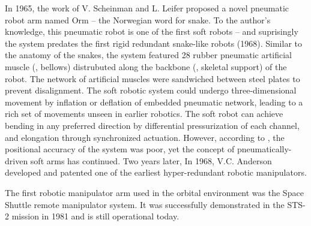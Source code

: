 In 1965, the work of V. Scheinman and L. Leifer proposed a novel pneumatic robot arm named Orm -- the Norwegian word for snake. To the author's knowledge, this pneumatic robot is one of the first soft robots -- and suprisingly the system predates the first rigid redundant snake-like robots (1968). Similar to the anatomy of the snakes, the system featured 28 rubber pneumatic artificial muscle (\ie, bellows) distrubuted along the backbone (\ie, skeletal support) of the robot. The network of artificial muscles were sandwiched between steel plates to prevent disalignment. The soft robotic system could undergo three-dimensional movement by inflation or deflation of embedded pneumatic network, leading to a rich set of movements unseen in earlier robotics. The soft robot can achieve bending in any preferred direction by differential pressurization of each channel, and elongation through synchronized actuation. However, according to \cite{}, the positional accuracy of the system was poor, yet the concept of pneumatically-driven soft arms has continued. Two years later, In 1968, V.C. Anderson developed and patented one of the earliest hyper-redundant robotic manipulators.



% 


The first robotic manipulator arm used in the orbital environment was the Space Shuttle remote manipulator system. It was successfully demonstrated in the STS-2 mission in 1981 and is still operational today.

